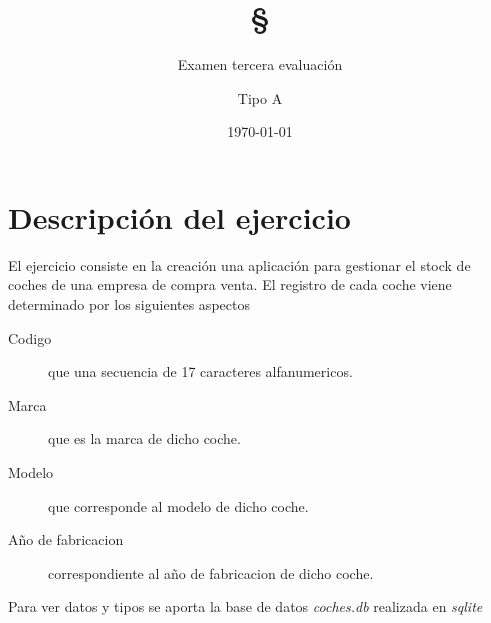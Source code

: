 \documentclass[4paper]{article}
\author{Examen tercera evaluación}
\author{Tipo A}
\title{\textbf{\S}}
\date{\today}
\begin{document}
\maketitle 
\section*{Descripción del ejercicio}
El ejercicio consiste en la creación una aplicación para gestionar el stock de coches de una empresa de compra venta. El registro de cada coche viene determinado por los siguientes aspectos
\begin{description}
\item[Codigo] que una secuencia de 17 caracteres alfanumericos.
\item[Marca] que es la marca de dicho coche.
\item[Modelo] que corresponde al modelo de dicho coche.
\item[Año de fabricacion] correspondiente al año de fabricacion de dicho coche.
\end{description}
Para ver datos y tipos se aporta la base de datos \emph{coches.db} realizada en \emph{sqlite}
\end{document}
